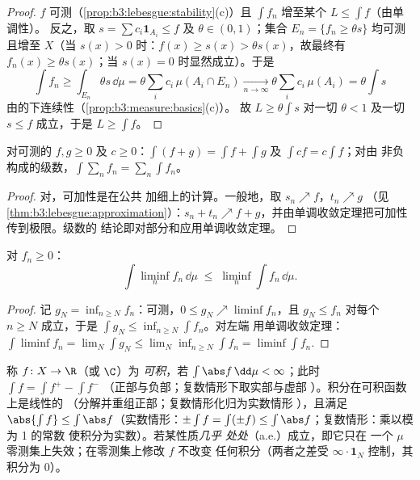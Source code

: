 \begin{proof}
$f$ 可测（\cref{prop:b3:lebesgue:stability}(c)）且
$\int f_n$ 增至某个 $L \leq \int f$（由单调性）。
反之，取 $s = \sum c_i\mathbf 1_{A_i} \leq f$
及 $\theta \in (0,1)$；集合 $E_n = \{f_n \geq \theta s\}$
均可测且增至 $X$（当 $s(x) > 0$ 时：$f(x)
\geq s(x) > \theta s(x)$，故最终有 $f_n(x) \geq \theta
s(x)$；当 $s(x) = 0$ 时显然成立）。于是
\[
\int f_n \geq \int_{E_n}\theta s\,\dd\mu
= \theta\sum_i c_i\,\mu(A_i \cap E_n)
\xrightarrow[n\to\infty]{} \theta\sum_ic_i\,\mu(A_i)
= \theta\int s
\]
由的下连续性（\cref{prop:b3:measure:basics}(c)）。
故 $L \geq \theta\int s$ 对一切 $\theta < 1$ 及一切 $s
\leq f$ 成立，于是 $L \geq \int f$。
\end{proof}

\begin{corollary}\label{cor:b3:lebesgue:additivity}
对可测的 $f, g \geq 0$ 及 $c \geq 0$：$\int(f + g) =
\int f + \int g$ 及 $\int cf = c\int f$；对由
非负构成的级数，$\int\sum_nf_n =
\sum_n\int f_n$。
\end{corollary}

\begin{proof}
对，可加性是在公共
加细上的计算。一般地，取 $s_n \nearrow f$，$t_n \nearrow g$
（见\cref{thm:b3:lebesgue:approximation}）：$s_n + t_n \nearrow f +
g$，并由单调收敛定理把可加性传到极限。级数的
结论即对部分和应用单调收敛定理。
\end{proof}

\begin{theorem}[法图引理]\label{thm:b3:lebesgue:fatou}
对 $f_n \geq 0$：
\[
\int \liminf_n f_n \,\dd\mu \;\leq\; \liminf_n \int
f_n\,\dd\mu .
\]
\end{theorem}

\begin{proof}
记 $g_N = \inf_{n\geq N}f_n$：可测，$0 \leq g_N \nearrow
\liminf f_n$，且 $g_N \leq f_n$ 对每个 $n \geq N$ 成立，于是
$\int g_N \leq \inf_{n \geq N}\int f_n$。对左端
用单调收敛定理：$\int\liminf f_n = \lim_N\int g_N \leq
\lim_N\inf_{n\geq N}\int f_n = \liminf\int f_n$.
\end{proof}

\begin{definition}\label{def:b3:lebesgue:l1}
称 $f \colon X \to \R$（或 $\C$）为
\emph{可积}，若 $\int\abs
f\,\dd\mu < \infty$；此时 $\int f = \int f^+ - \int f^-$
（正部与负部；复数情形下取实部与虚部
）。积分在可积函数上是线性的
（分解并重组正部；复数情形化归为实数情形
），且满足 $\abs{\int f} \leq
\int\abs f$（实数情形：$\pm\int f = \int(\pm f) \leq
\int\abs f$；复数情形：乘以模为 1 的常数
使积分为实数）。若某性质\emph{几乎
处处}（a.e.）成立，即它只在
一个 $\mu$ 零测集上失效；在零测集上修改 $f$ 不改变
任何积分（两者之差受 $\infty\cdot\mathbf
1_N$ 控制，其积分为 $0$）。
\end{definition}

